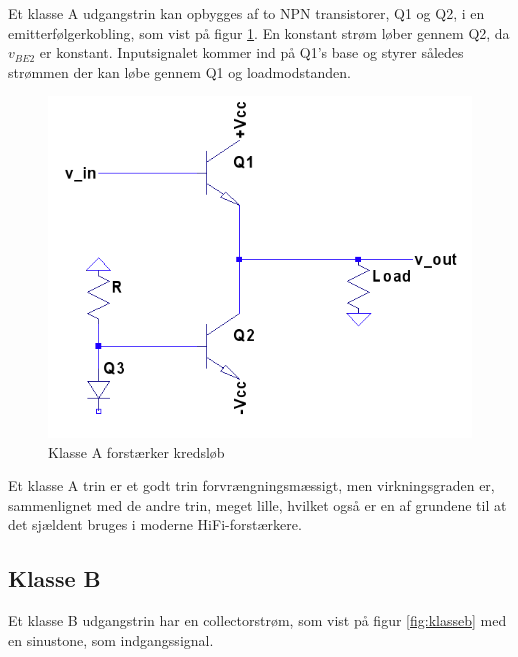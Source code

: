Et klasse A udgangstrin kan opbygges af to NPN transistorer, Q1 og Q2, i en emitterfølgerkobling, som vist på figur \ref{fig:classa}. En konstant strøm løber gennem Q2, da $v_{BE2}$ er konstant. Inputsignalet kommer ind på Q1's base og styrer således strømmen der kan løbe gennem Q1 og loadmodstanden. 

\begin{figure}[h]
\centering
\includegraphics[scale=.35]{indledende_analyse/klasser/classa.png}
\caption{Klasse A forstærker kredsløb}
\label{fig:classa}
\end{figure}

Et klasse A trin er et godt trin forvrængningsmæssigt, men virkningsgraden er, sammenlignet med de andre trin, meget lille, hvilket også er en af grundene til at det sjældent bruges i moderne HiFi-forstærkere.

\subsection{Klasse B}

Et klasse B udgangstrin har en collectorstrøm, som vist på figur \ref{fig:klasseb} med en sinustone, som indgangssignal. 

